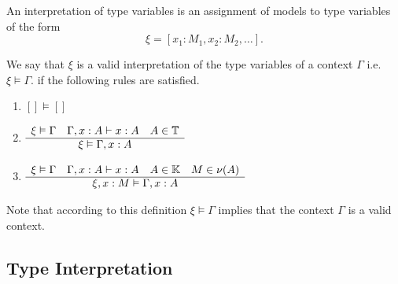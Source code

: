 \begin{definition}
  An interpretation of type variables is an assignment of models to type
  variables of the form
  $$
  \xi = [x_1: M_1, x_2: M_2, \ldots].
  $$

  We say that $\xi$ is a valid interpretation of the type variables of a
  context $\Gamma$ i.e. $\xi \vDash \Gamma$. if the following rules are satisfied.
  \begin{enumerate}

  \item $ [] \vDash []$

  \item
    $\begin{array}{c} \xi \vDash \Gamma
      \quad
      \Gamma,x:A \vdash x:A
      \quad
      A \in \mathbb{T}
     \\ \hline \xi \vDash \Gamma,x:A\end{array}
    $

  \item
    $\begin{array}{c} \xi \vDash \Gamma
      \quad
      \Gamma,x:A \vdash x:A
      \quad
      A \in \mathbb{K}
      \quad
      M \in \nu(A)
     \\ \hline \xi,x:M \vDash \Gamma,x:A\end{array}
    $
  \end{enumerate}

  Note that according to this definition $\xi \vDash \Gamma$ implies that the
  context $\Gamma$ is a valid context.
\end{definition}



\subsection{Type Interpretation}

